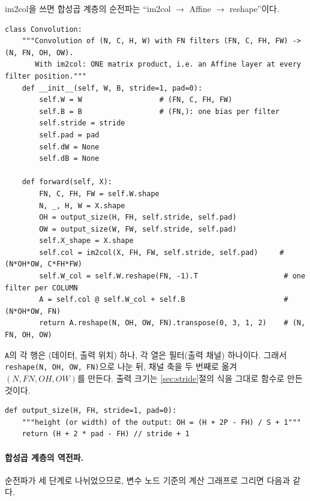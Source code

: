 \documentclass[11pt,a4paper]{article}
\begin{document}
im2col을 쓰면 합성곱 계층의 순전파는 ``im2col $\to$ Affine $\to$ reshape''이다.
\begin{lstlisting}
class Convolution:
    """Convolution of (N, C, H, W) with FN filters (FN, C, FH, FW) -> (N, FN, OH, OW).
       With im2col: ONE matrix product, i.e. an Affine layer at every filter position."""
    def __init__(self, W, B, stride=1, pad=0):
        self.W = W                  # (FN, C, FH, FW)
        self.B = B                  # (FN,): one bias per filter
        self.stride = stride
        self.pad = pad
        self.dW = None
        self.dB = None

    def forward(self, X):
        FN, C, FH, FW = self.W.shape
        N, _, H, W = X.shape
        OH = output_size(H, FH, self.stride, self.pad)
        OW = output_size(W, FW, self.stride, self.pad)
        self.X_shape = X.shape
        self.col = im2col(X, FH, FW, self.stride, self.pad)     # (N*OH*OW, C*FH*FW)
        self.W_col = self.W.reshape(FN, -1).T                    # one filter per COLUMN
        A = self.col @ self.W_col + self.B                       # (N*OH*OW, FN)
        return A.reshape(N, OH, OW, FN).transpose(0, 3, 1, 2)    # (N, FN, OH, OW)
\end{lstlisting}
\texttt{A}의 각 행은 (데이터, 출력 위치) 하나, 각 열은 필터(출력 채널) 하나이다.
그래서 \texttt{reshape(N, OH, OW, FN)}으로 나눈 뒤, 채널 축을 두 번째로 옮겨 $(N,FN,OH,OW)$를 만든다.
출력 크기는 \ref{sec:stride}절의 식을 그대로 함수로 만든 것이다.
\begin{lstlisting}
def output_size(H, FH, stride=1, pad=0):
    """height (or width) of the output: OH = (H + 2P - FH) / S + 1"""
    return (H + 2 * pad - FH) // stride + 1
\end{lstlisting}

\paragraph{합성곱 계층의 역전파.}
순전파가 세 단계로 나뉘었으므로, 변수 노드 기준의 계산 그래프로 그리면 다음과 같다.
\end{document}
